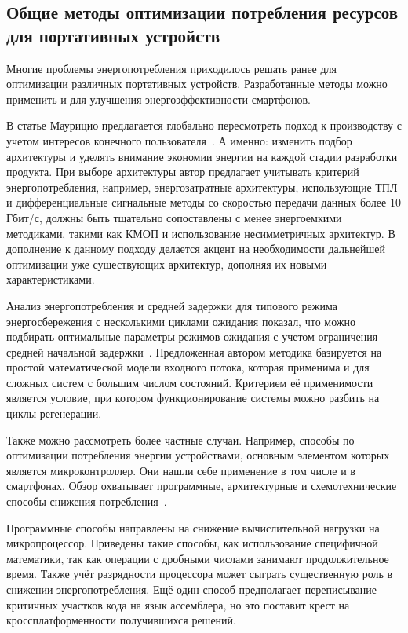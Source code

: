 \documentclass[a4paper,14pt]{extarticle} %
\begin{document}
	\subsection{Общие  методы оптимизации потребления ресурсов для портативных устройств}
	
	Многие проблемы энергопотребления приходилось решать ранее для оптимизации различных портативных устройств. Разработанные методы можно применить и для улучшения энергоэффективности смартфонов. 
	
	В статье Маурицио предлагается глобально пересмотреть подход к производству с учетом интересов конечного пользователя~\parencite{маурицио2008переоценка}. А именно: изменить подбор архитектуры и уделять внимание экономии энергии на каждой стадии разработки продукта. При выборе архитектуры автор предлагает учитывать критерий энергопотребления, например, энергозатратные архитектуры, использующие ТПЛ и дифференциальные сигнальные методы со скоростью передачи данных более 10 Гбит/с, должны быть тщательно сопоставлены с менее энергоемкими методиками, такими как КМОП и использование несимметричных архитектур. В дополнение к данному подходу делается акцент на необходимости дальнейшей оптимизации уже существующих архитектур, дополняя их новыми характеристиками.
	
	Анализ энергопотребления и средней задержки для типового режима энергосбережения с несколькими циклами ожидания показал, что можно подбирать оптимальные параметры режимов ожидания с учетом ограничения средней начальной задержки~\parencite{пустовалов2013анализ}. Предложенная автором методика базируется на простой математической модели входного потока, которая применима и для сложных систем с большим числом состояний. Критерием её применимости является условие, при котором функционирование системы можно разбить на циклы регенерации.
	
	Также можно рассмотреть более частные случаи. Например, способы по оптимизации потребления энергии устройствами, основным элементом которых является микроконтроллер. Они нашли себе применение в том числе и в смартфонах. Обзор охватывает программные, архитектурные и схемотехнические способы снижения потребления~\parencite{кафтанников2013оптимизация}.
	
	Программные способы направлены на снижение вычислительной нагрузки на микропроцессор. Приведены такие способы, как использование специфичной математики, так как операции с дробными числами занимают продолжительное время. Также учёт разрядности процессора может сыграть существенную роль в снижении энергопотребления. Ещё один способ предполагает переписывание критичных участков кода на язык ассемблера, но это поставит крест на кроссплатформенности получившихся решений.
	
\end{document}

